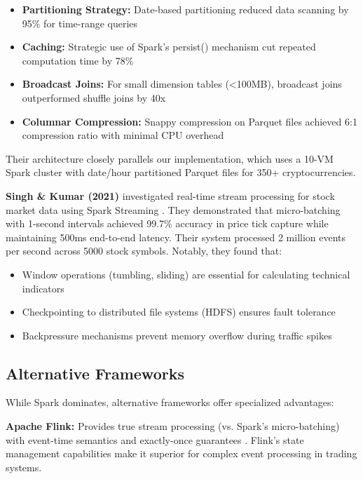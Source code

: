 \documentclass[conference]{IEEEtran}
\begin{document}
\begin{itemize}
    \item \textbf{Partitioning Strategy:} Date-based partitioning reduced data scanning by 95\% for time-range queries
    \item \textbf{Caching:} Strategic use of Spark's persist() mechanism cut repeated computation time by 78\%
    \item \textbf{Broadcast Joins:} For small dimension tables (<100MB), broadcast joins outperformed shuffle joins by 40x
    \item \textbf{Columnar Compression:} Snappy compression on Parquet files achieved 6:1 compression ratio with minimal CPU overhead
\end{itemize}

Their architecture closely parallels our implementation, which uses a 10-VM Spark cluster with date/hour partitioned Parquet files for 350+ cryptocurrencies.

\textbf{Singh \& Kumar (2021)} investigated real-time stream processing for stock market data using Spark Streaming \cite{singh2021web}. They demonstrated that micro-batching with 1-second intervals achieved 99.7\% accuracy in price tick capture while maintaining 500ms end-to-end latency. Their system processed 2 million events per second across 5000 stock symbols. Notably, they found that:

\begin{itemize}
    \item Window operations (tumbling, sliding) are essential for calculating technical indicators
    \item Checkpointing to distributed file systems (HDFS) ensures fault tolerance
    \item Backpressure mechanisms prevent memory overflow during traffic spikes
\end{itemize}

\subsection{Alternative Frameworks}

While Spark dominates, alternative frameworks offer specialized advantages:

\textbf{Apache Flink:} Provides true stream processing (vs. Spark's micro-batching) with event-time semantics and exactly-once guarantees \cite{carbone2017state}. Flink's state management capabilities make it superior for complex event processing in trading systems.
\end{document}
